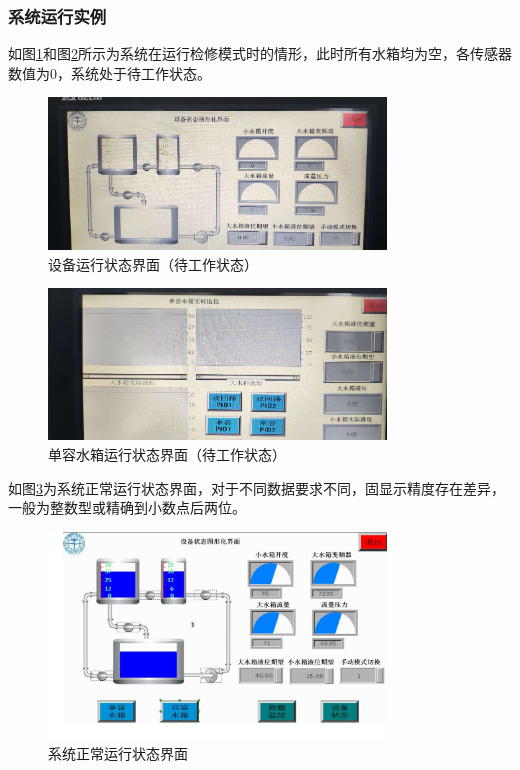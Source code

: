 \documentclass[UTF8]{article}
\begin{document}
\subsubsection{系统运行实例}
如图\ref{fig:img11}和图\ref{fig:img12}所示为系统在运行检修模式时的情形，此时所有水箱均为空，各传感器数值为0，系统处于待工作状态。
\begin{figure}[H]
    \centering %
    \includegraphics[width=0.8\textwidth]{figure/设备运行状态界面（待工作状态）.png} 
    \caption{设备运行状态界面（待工作状态）} %
    \label{fig:img11} %
\end{figure}
\begin{figure}[H]
    \centering %
    \includegraphics[width=0.8\textwidth]{figure/单容水箱运行状态界面（待工作状态）.png} 
    \caption{单容水箱运行状态界面（待工作状态）} %
    \label{fig:img12} %
\end{figure}

如图\ref{fig:img13}为系统正常运行状态界面，对于不同数据要求不同，固显示精度存在差异，一般为整数型或精确到小数点后两位。
\begin{figure}[H]
    \centering %
    \includegraphics[width=0.8\textwidth]{figure/系统正常运行状态界面.png} 
    \caption{系统正常运行状态界面} %
    \label{fig:img13} %
\end{figure}
\end{document}
